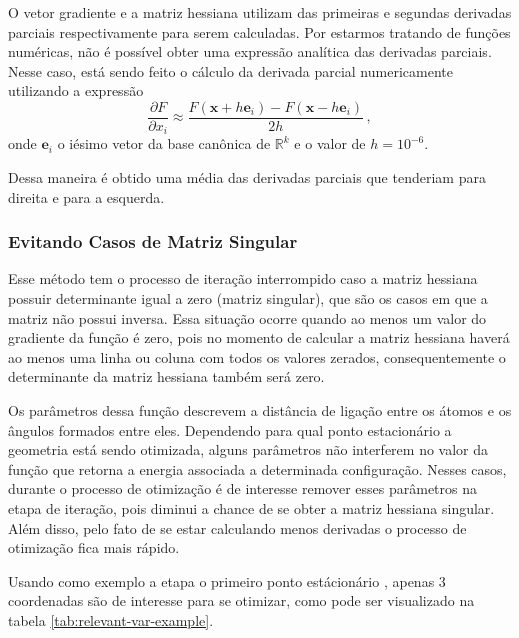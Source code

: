 O vetor gradiente e a matriz hessiana utilizam das primeiras e segundas derivadas parciais respectivamente para serem calculadas. Por estarmos tratando de funções numéricas, não é possível obter uma expressão analítica das derivadas parciais. Nesse caso, está sendo feito o cálculo da derivada parcial numericamente utilizando a expressão
%
\begin{equation}
  \label{eq:partial_derivative}
  \frac{\partial F}{\partial x_i} \approx \frac{F(\mathbf{x}+h \mathbf{e}_i) - F(\mathbf{x}-h \mathbf{e}_i)}{2h} \,,
\end{equation}
%
onde $\mathbf{e}_i$ o iésimo vetor da base canônica de $\mathds{R}^k$ e o valor de $h = 10^{-6}$.

Dessa maneira é obtido uma média das derivadas parciais que tenderiam para direita e para a esquerda.

\subsubsection{Evitando Casos de Matriz Singular}

Esse método tem o processo de iteração interrompido caso a matriz hessiana possuir determinante igual a zero (matriz singular), que são os casos em que a matriz não possui inversa. Essa situação ocorre quando ao menos um valor do gradiente da função é zero, pois no momento de calcular a matriz hessiana haverá ao menos uma linha ou coluna com todos os valores zerados, consequentemente o determinante da matriz hessiana também será zero.

Os parâmetros dessa função descrevem a distância de ligação entre os átomos e os ângulos formados entre eles. Dependendo para qual ponto estacionário a geometria está sendo otimizada, alguns parâmetros não interferem no valor da função que retorna a energia associada a determinada configuração. Nesses casos, durante o processo de otimização é de interesse remover esses parâmetros na etapa de iteração, pois diminui a chance de se obter a matriz hessiana singular. Além disso, pelo fato de se estar calculando menos derivadas o processo de otimização fica mais rápido. 

Usando como exemplo a etapa o primeiro ponto estácionário , apenas 3 coordenadas são de interesse para se otimizar, como pode ser visualizado na tabela \ref{tab:relevant-var-example}.

